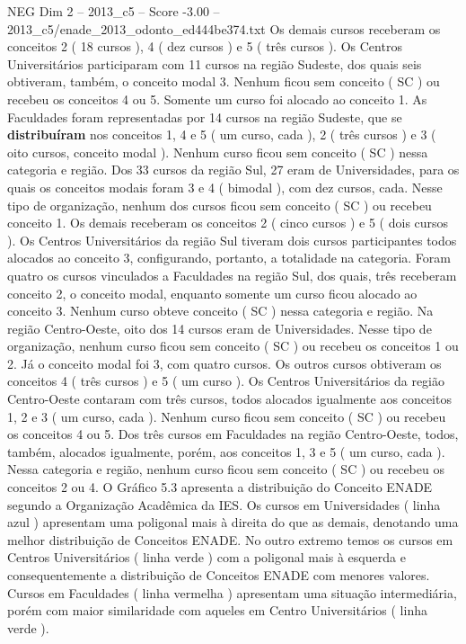 \begin{textsample}{NEG Dim 2 – 2013\_c5 – Score -3.00 – 2013\_c5/enade\_2013\_odonto\_ed444be374.txt}
Os demais cursos receberam os conceitos 2 ( 18 cursos ), 4 ( dez cursos ) e 5 ( três cursos ).
Os Centros Universitários participaram com 11 cursos na região Sudeste, dos quais seis obtiveram, também, o conceito modal 3.
Nenhum ficou sem conceito ( SC ) ou recebeu os conceitos 4 ou 5.
Somente um curso foi alocado ao conceito 1.
As Faculdades foram representadas por 14 cursos na região Sudeste, que se \textbf{distribuíram} nos conceitos 1, 4 e 5 ( um curso, cada ), 2 ( três cursos ) e 3 ( oito cursos, conceito modal ).
Nenhum curso ficou sem conceito ( SC ) nessa categoria e região.
Dos 33 cursos da região Sul, 27 eram de Universidades, para os quais os conceitos modais foram 3 e 4 ( bimodal ), com dez cursos, cada.
Nesse tipo de organização, nenhum dos cursos ficou sem conceito ( SC ) ou recebeu conceito 1.
Os demais receberam os conceitos 2 ( cinco cursos ) e 5 ( dois cursos ).
Os Centros Universitários da região Sul tiveram dois cursos participantes todos alocados ao conceito 3, configurando, portanto, a totalidade na categoria.
Foram quatro os cursos vinculados a Faculdades na região Sul, dos quais, três receberam conceito 2, o conceito modal, enquanto somente um curso ficou alocado ao conceito 3.
Nenhum curso obteve conceito ( SC ) nessa categoria e região.
Na região Centro-Oeste, oito dos 14 cursos eram de Universidades.
Nesse tipo de organização, nenhum curso ficou sem conceito ( SC ) ou recebeu os conceitos 1 ou 2.
Já o conceito modal foi 3, com quatro cursos.
Os outros cursos obtiveram os conceitos 4 ( três cursos ) e 5 ( um curso ).
Os Centros Universitários da região Centro-Oeste contaram com três cursos, todos alocados igualmente aos conceitos 1, 2 e 3 ( um curso, cada ).
Nenhum curso ficou sem conceito ( SC ) ou recebeu os conceitos 4 ou 5.
Dos três cursos em Faculdades na região Centro-Oeste, todos, também, alocados igualmente, porém, aos conceitos 1, 3 e 5 ( um curso, cada ).
Nessa categoria e região, nenhum curso ficou sem conceito ( SC ) ou recebeu os conceitos 2 ou 4.
O Gráfico 5.3 apresenta a distribuição do Conceito ENADE segundo a Organização Acadêmica da IES.
Os cursos em Universidades ( linha azul ) apresentam uma poligonal mais à direita do que as demais, denotando uma melhor distribuição de Conceitos ENADE.
No outro extremo temos os cursos em Centros Universitários ( linha verde ) com a poligonal mais à esquerda e consequentemente a distribuição de Conceitos ENADE com menores valores.
Cursos em Faculdades ( linha vermelha ) apresentam uma situação intermediária, porém com maior similaridade com aqueles em Centro Universitários ( linha verde ).

\end{textsample}
